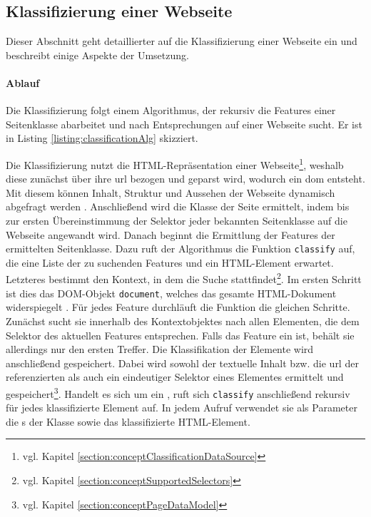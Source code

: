 \subsection{Klassifizierung einer Webseite}
    \label{section:solutionDetailsClassificationServiceClassification}
    Dieser Abschnitt geht detaillierter auf die Klassifizierung einer Webseite ein
    und beschreibt einige Aspekte der Umsetzung.

    \paragraph{Ablauf}
    Die Klassifizierung folgt einem Algorithmus,
    der rekursiv die Features einer Seitenklasse abarbeitet und nach Entsprechungen
    auf einer Webseite sucht.
    Er ist in Listing \ref{listing:classificationAlg} skizziert.

    

    Die Klassifizierung nutzt die HTML-Repräsentation einer
    Webseite\footnote{vgl. Kapitel \ref{section:conceptClassificationDataSource}},
    weshalb diese zunächst über ihre \gls{url} bezogen und geparst wird,
    wodurch ein \gls{dom} entsteht.
    Mit diesem können Inhalt, Struktur und Aussehen der Webseite
    dynamisch abgefragt werden \cite{w3c:dom}.
    Anschließend wird die Klasse der Seite ermittelt,
    indem bis zur ersten Übereinstimmung der Selektor jeder bekannten
    Seitenklasse auf die Webseite angewandt wird.
    Danach beginnt die Ermittlung der Features der ermittelten Seitenklasse.
    Dazu ruft der Algorithmus die Funktion \texttt{classify} auf,
    die eine Liste der zu suchenden Features und ein HTML-Element erwartet.
    Letzteres bestimmt den Kontext, in dem die Suche stattfindet\footnote{vgl. Kapitel \ref{section:conceptSupportedSelectors}}.
    Im ersten Schritt ist dies das DOM-Objekt \texttt{document},
    welches das gesamte HTML-Dokument widerspiegelt \cite[Kapitel 1.4]{w3c:dom}.
    Für jedes Feature durchläuft die Funktion die gleichen Schritte.
    Zunächst sucht sie innerhalb des Kontextobjektes nach allen Elementen,
    die dem Selektor des aktuellen Features entsprechen.
    Falls das Feature ein {\scalarFeature} ist, behält sie allerdings nur den ersten Treffer.
    Die Klassifikation der Elemente wird anschließend gespeichert.
    Dabei wird sowohl der textuelle Inhalt bzw. die \gls{url}
    der referenzierten {\resource} als auch ein eindeutiger Selektor eines Elementes ermittelt
    und gespeichert\footnote{vgl. Kapitel \ref{section:conceptPageDataModel}}.
    Handelt es sich um ein {\collectionFeature}, ruft sich \texttt{classify} anschließend rekursiv für jedes klassifizierte Element auf.
    In jedem Aufruf verwendet sie als Parameter die {\childFeature}s der Klasse sowie das klassifizierte HTML-Element.


